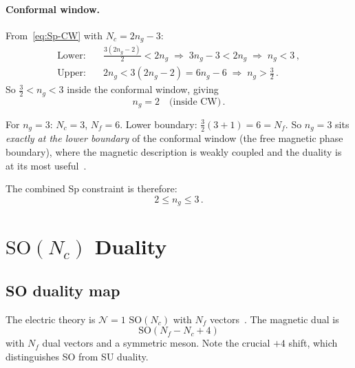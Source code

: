 \documentclass[11pt,a4paper]{article}
\theoremstyle{plain}
\theoremstyle{definition}
\theoremstyle{remark}
\newcommand{\Nc}{N_{\!c}}
\newcommand{\Nf}{N_{\!f}}
\newcommand{\ngen}{n_g}
\newcommand{\SO}[1]{\mathrm{SO}(#1)}
\begin{document}
\paragraph{Conformal window.}
From~\eqref{eq:Sp-CW} with $\Nc = 2\ngen - 3$:
\begin{align}
  \text{Lower:}&\quad \frac{3(2\ngen - 2)}{2} < 2\ngen
  \;\Longrightarrow\;
  3\ngen - 3 < 2\ngen
  \;\Longrightarrow\;
  \ngen < 3\,,
  \label{eq:Sp-CW-lower} \\
  \text{Upper:}&\quad 2\ngen < 3(2\ngen - 2) = 6\ngen - 6
  \;\Longrightarrow\;
  \ngen > \frac{3}{2}\,.
  \label{eq:Sp-CW-upper}
\end{align}
So $\frac{3}{2} < \ngen < 3$ inside the conformal window, giving
\begin{equation}
  \ngen = 2 \quad\text{(inside CW)}\,.
\end{equation}

For $\ngen = 3$: $\Nc = 3$, $\Nf = 6$.  Lower boundary:
$\frac{3}{2}(3 + 1) = 6 = \Nf$.  So $\ngen = 3$ sits \emph{exactly at
the lower boundary} of the conformal window (the free magnetic phase
boundary), where the magnetic description is weakly coupled and the
duality is at its most useful~\cite{Paper1}.

The combined Sp constraint is therefore:
\begin{equation}\label{eq:Sp-combined}
  \boxed{2 \leq \ngen \leq 3}\,.
\end{equation}


\section{$\SO{\Nc}$ Duality}
\label{sec:SO-duality}

\subsection{SO duality map}

The electric theory is $\mathcal{N}=1$ $\SO{\Nc}$ with $\Nf$
vectors~\cite{IS9506101}.  The magnetic dual is
\begin{equation}\label{eq:SO-dual}
  \SO{\Nf - \Nc + 4}
\end{equation}
with $\Nf$ dual vectors and a symmetric meson.  Note the crucial
$+4$ shift, which distinguishes SO from SU duality.
\end{document}
